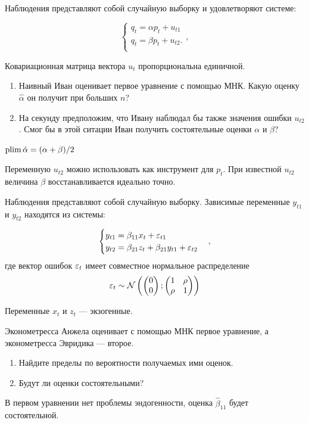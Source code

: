 \begin{problem}

Наблюдения представляют собой случайную выборку и удовлетворяют системе:

  \[
  \begin{cases}
    q_t = \alpha p_t + u_{t1} \\
    q_t = \beta p_t + u_{t2}. \\
  \end{cases},
  \]

  Ковариационная матрица вектора $u_t$ пропорциональна единичной.


  \begin{enumerate}
    \item Наивный Иван оценивает первое уравнение с помощью МНК. Какую оценку $\hat\alpha$ он получит при больших $n$?
    \item На секунду предположим, что Ивану наблюдал бы также значения ошибки $u_{t2}$. 
    Смог бы в этой ситации Иван получить состоятельные оценки $\alpha$ и $\beta$?
  \end{enumerate}


\begin{sol}
$\operatorname*{plim} \hat \alpha = (\alpha + \beta)/2$

Переменную $u_{t2}$ можно использовать как инструмент для $p_t$. 
При известной $u_{t2}$ величина $\beta$ восстанавливается идеально точно. 
\end{sol}
\end{problem}




\begin{problem}
Наблюдения представляют собой случайную выборку. Зависимые переменные $y_{t1}$ и $y_{t2}$ находятся из системы:

\[
\begin{cases}
y_{t1} = \beta_{11} x_t + \varepsilon_{t1} \\
y_{t2} = \beta_{21} z_t + \beta_{21} y_{t1} + \varepsilon_{t2}
\end{cases},
\]
где вектор ошибок $\varepsilon_t$ имеет совместное нормальное распределение
\[
\varepsilon_t \sim \mathcal{N}\left(
\begin{pmatrix}
  0 \\
  0
\end{pmatrix};
\begin{pmatrix}
  1 & \rho \\
  \rho & 1
\end{pmatrix}
\right)
\]

Переменные $x_t$ и $z_t$ — экзогенные. 

Эконометресса Анжела оценивает с помощью МНК первое уравнение, а эконометресса Эвридика — второе.
\begin{enumerate}
\item Найдите пределы по вероятности получаемых ими оценок.
\item Будут ли оценки состоятельными?
\end{enumerate}

\begin{sol}
  В первом уравнении нет проблемы эндогенности, оценка $\hat \beta_{11}$ будет состоятельной. 
\end{sol}
\end{problem}
  


